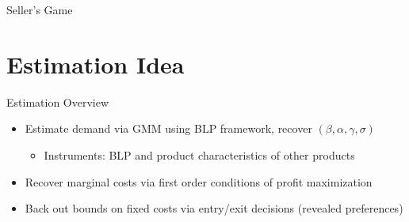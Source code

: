 \documentclass[aspectratio=169,professionalfonts]{beamer}
\begin{document}
\begin{frame}{Seller's Game}
\centering
{}
\end{frame}



\section{Estimation Idea}

\begin{frame}{Estimation Overview}
  \begin{itemize}
    \item Estimate demand via GMM using BLP framework, recover $(\beta, \alpha, \gamma, \sigma)$
    \begin{itemize}
      \item Instruments: BLP and product characteristics of other products
    \end{itemize}
    \item Recover marginal costs via first order conditions of profit maximization
    \item Back out bounds on fixed costs via entry/exit decisions (revealed preferences)
  \end{itemize}
\end{frame}
\end{document}
